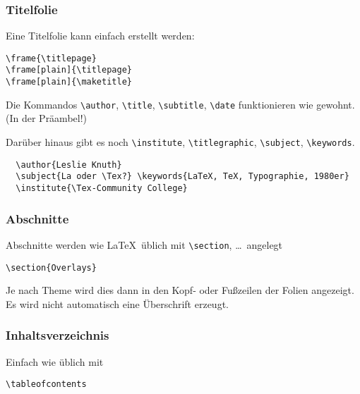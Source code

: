 \begin{slide}
  \frametitle{Titelfolie}

  Eine Titelfolie kann einfach erstellt werden:
\begin{lstlisting}
\frame{\titlepage}
\frame[plain]{\titlepage}
\frame[plain]{\maketitle}
\end{lstlisting}

  \onslide<+->

  Die Kommandos \lstinline{\author}, \lstinline{\title}, \lstinline{\subtitle},
  \lstinline{\date} funktionieren wie gewohnt. (In der Präambel!)

  \onslide<+->

  Darüber hinaus gibt es noch \lstinline{\institute}, \lstinline{\titlegraphic},
  \lstinline{\subject}, \lstinline{\keywords}.
\begin{lstlisting}
  \author{Leslie Knuth}
  \subject{La oder \Tex?} \keywords{LaTeX, TeX, Typographie, 1980er}
  \institute{\Tex-Community College}
\end{lstlisting}

\end{slide}

\begin{slide}
  \frametitle{Abschnitte}

  \onslide<+->

  Abschnitte werden wie \LaTeX\ üblich mit \lstinline{\section}, \dots\ angelegt

\begin{lstlisting}
\section{Overlays}
\end{lstlisting}

  \onslide<+->

  Je nach Theme wird dies dann in den Kopf- oder Fußzeilen der Folien angezeigt. Es wird nicht automatisch eine Überschrift erzeugt.
\end{slide}

\begin{slide}
  \frametitle{Inhaltsverzeichnis}


  Einfach wie üblich mit
\begin{lstlisting}
\tableofcontents
\end{lstlisting}


\end{slide}

